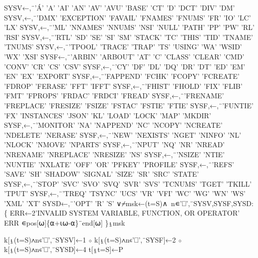 \documentclass{article}%
\begin{document}
\nwenddocs{}\endmoddef\nwstartdeflinemarkup{}\nwenddeflinemarkup
SYSV←,¨'Á' 'A' 'AI' 'AN' 'AV' 'AVU' 'BASE' 'CT' 'D' 'DCT' 'DIV' 'DM'
SYSV,←,¨'DMX' 'EXCEPTION' 'FAVAIL' 'FNAMES' 'FNUMS' 'FR' 'IO' 'LC' 'LX'
SYSV,←,¨'ML' 'NNAMES' 'NNUMS' 'NSI' 'NULL' 'PATH' 'PP' 'PW' 'RL' 'RSI'
SYSV,←,¨'RTL' 'SD' 'SE' 'SI' 'SM' 'STACK' 'TC' 'THIS' 'TID' 'TNAME' 'TNUMS'
SYSV,←,¨'TPOOL' 'TRACE' 'TRAP' 'TS' 'USING' 'WA' 'WSID' 'WX' 'XSI'
SYSF←,¨'ARBIN' 'ARBOUT' 'AT' 'C' 'CLASS' 'CLEAR' 'CMD' 'CONV' 'CR' 'CS' 'CSV'
SYSF,←,¨'CY' 'DF' 'DL' 'DQ' 'DR' 'DT' 'ED' 'EM' 'EN' 'EX' 'EXPORT'
SYSF,←,¨'FAPPEND' 'FCHK' 'FCOPY' 'FCREATE' 'FDROP' 'FERASE' 'FFT' 'IFFT'
SYSF,←,¨'FHIST' 'FHOLD' 'FIX' 'FLIB' 'FMT' 'FPROPS' 'FRDAC' 'FRDCI' 'FREAD'
SYSF,←,¨'FRENAME' 'FREPLACE' 'FRESIZE' 'FSIZE' 'FSTAC' 'FSTIE' 'FTIE'
SYSF,←,¨'FUNTIE' 'FX' 'INSTANCES' 'JSON' 'KL' 'LOAD' 'LOCK' 'MAP' 'MKDIR'
SYSF,←,¨'MONITOR' 'NA' 'NAPPEND' 'NC' 'NCOPY' 'NCREATE' 'NDELETE' 'NERASE'
SYSF,←,¨'NEW' 'NEXISTS' 'NGET' 'NINFO' 'NL' 'NLOCK' 'NMOVE' 'NPARTS'
SYSF,←,¨'NPUT' 'NQ' 'NR' 'NREAD' 'NRENAME' 'NREPLACE' 'NRESIZE' 'NS'
SYSF,←,¨'NSIZE' 'NTIE' 'NUNTIE' 'NXLATE' 'OFF' 'OR' 'PFKEY' 'PROFILE'
SYSF,←,¨'REFS' 'SAVE' 'SH' 'SHADOW' 'SIGNAL' 'SIZE' 'SR' 'SRC' 'STATE'
SYSF,←,¨'STOP' 'SVC' 'SVO' 'SVQ' 'SVR' 'SVS' 'TCNUMS' 'TGET' 'TKILL' 'TPUT'
SYSF,←,¨'TREQ' 'TSYNC' 'UCS' 'VR' 'VFI' 'WC' 'WG' 'WN' 'WS' 'XML' 'XT'
SYSD←,¨'OPT' 'R' 'S'
∨⌿msk←(t=S)∧~n∊'⎕',¨SYSV,SYSF,SYSD:\{
        ERR←2'INVALID SYSTEM VARIABLE, FUNCTION, OR OPERATOR'
        ERR ∊pos[⍵]\{⍺+⍳⍵-⍺\}¨end[⍵]
\}⍸msk
\nwendcode{}\nwdocspar

\nwenddocs{}\endmoddef\nwstartdeflinemarkup{}\nwenddeflinemarkup
k[⍸(t=S)∧n∊'⎕',¨SYSV]←1 ⋄ k[⍸(t=S)∧n∊'⎕',¨SYSF]←2 ⋄ k[⍸(t=S)∧n∊'⎕',¨SYSD]←4
t[⍸t=S]←P
\nwendcode{}\nwdocspar
\end{document}
